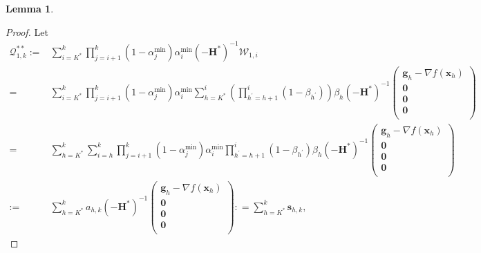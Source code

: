 \documentclass[aos]{imsart}
\numberwithin{equation}{section}
\theoremstyle{plain}
\newtheorem{lemma}{Lemma}
\begin{document}
\begin{appendix}
\begin{lemma}
    
    
\end{lemma}



\begin{proof}

    Let 
    \begin{equation}
        \begin{split}
            \mathcal{Q}_{1,k}^{**}  := & \sum_{i=K^{*}}^{k} \prod_{j=i+1}^{k} (1-\alpha^{\min}_j) \alpha^{\min}_i \left(-\bm{H}^{*}\right)^{-1} \mathcal{W}_{1,i} \\
            = & \sum_{i=K^{*}}^{k} \prod_{j=i+1}^{k} (1-\alpha^{\min}_j) \alpha^{\min}_i  \sum_{h=K^{*}}^{i} \left( \prod_{h^{\prime}=h+1}^{i} (1-\beta_{h^{\prime}}) \right) \beta_h \left(-\bm{H}^{*}\right)^{-1}  \left( \begin{array}{c}
                \bm{g}_{h} - \nabla f(\bm{x}_h) \\
                \bm{0}\\
                \bm{0}\\
                \bm{0}\\
            \end{array}\right) \\
            = & \sum_{h=K^{*}}^{k} \sum_{i = h}^{k}  \prod_{j=i+1}^{k} \left(1-\alpha^{\min}_j \right) \alpha^{\min}_{i} \prod_{h^{\prime}=h+1}^{i} (1-\beta_{h^{\prime}}) \beta_{h} \left(-\bm{H}^{*}\right)^{-1}  \left( \begin{array}{c}
                \bm{g}_{h} - \nabla f(\bm{x}_h) \\
                \bm{0}\\
                \bm{0}\\
                \bm{0}\\
            \end{array}\right)\\
            := &  \sum_{h=K^{*}}^{k}  a_{h,k} \left(-\bm{H}^{*}\right)^{-1} \left( \begin{array}{c}
                \bm{g}_{h} - \nabla f(\bm{x}_h) \\
                \bm{0}\\
                \bm{0}\\
                \bm{0}\\
            \end{array}\right) : = \sum_{h=K^{*}}^{k} \bm{s}_{h,k},
        \end{split}
    \end{equation}

\end{proof}
\end{appendix}
\end{document}
